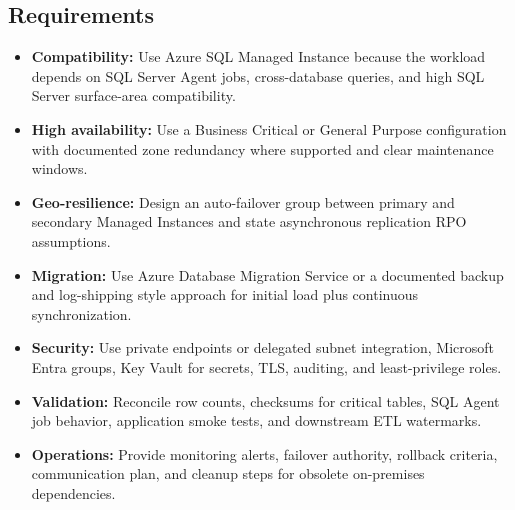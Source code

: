 \subsection*{Requirements}
\begin{itemize}
    \item \textbf{Compatibility:} Use Azure SQL Managed Instance because the workload depends on SQL Server Agent jobs, cross-database queries, and high SQL Server surface-area compatibility.
    \item \textbf{High availability:} Use a Business Critical or General Purpose configuration with documented zone redundancy where supported and clear maintenance windows.
    \item \textbf{Geo-resilience:} Design an auto-failover group between primary and secondary Managed Instances and state asynchronous replication RPO assumptions.
    \item \textbf{Migration:} Use Azure Database Migration Service or a documented backup and log-shipping style approach for initial load plus continuous synchronization.
    \item \textbf{Security:} Use private endpoints or delegated subnet integration, Microsoft Entra groups, Key Vault for secrets, TLS, auditing, and least-privilege roles.
    \item \textbf{Validation:} Reconcile row counts, checksums for critical tables, SQL Agent job behavior, application smoke tests, and downstream ETL watermarks.
    \item \textbf{Operations:} Provide monitoring alerts, failover authority, rollback criteria, communication plan, and cleanup steps for obsolete on-premises dependencies.
\end{itemize}

